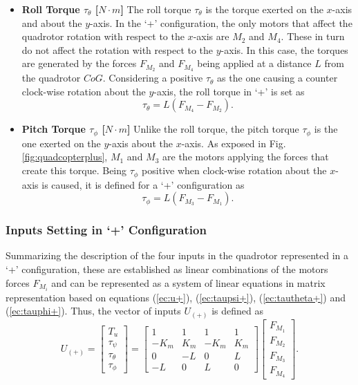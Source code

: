 \begin{itemize}
\item \textbf{Roll Torque $\tau_{\theta}$ [$N\cdot m$]}
The roll torque $\tau_\theta$ is the torque exerted on the $x$-axis and about the $y$-axis. In the `+' configuration, the only motors that affect the quadrotor rotation with respect to the $x$-axis are $M_2$ and $M_4$. These in turn do not affect the rotation with respect to the $y$-axis. In this case, the torques are generated by the forces $F_{M_2}$ and $F_{M_4}$ being applied at a distance $L$ from the quadrotor $CoG$. Considering a positive $\tau_\theta$ as the one causing a counter clock-wise rotation about the $y$-axis, the roll torque in `+' is set as
\begin{equation}
\label{ec:tautheta+}
\tau_{\theta} = L(F_{M_4}-F_{M_2}).
\end{equation}

\item \textbf{Pitch Torque $\tau_{\phi}$ [$N\cdot m$]}
Unlike the roll torque, the pitch torque $\tau_\phi$ is the one exerted on the $y$-axis about the $x$-axis. As exposed in Fig. \ref{fig:quadcopterplus}, $M_1$ and $M_3$ are the motors applying the forces that create this torque. Being $\tau_\phi$ positive when clock-wise rotation about the $x$-axis is caused, it is defined for a `+' configuration as
\begin{equation}
\label{ec:tauphi+}
\tau_{\phi} = L(F_{M_3}-F_{M_1}).
\end{equation}
\end{itemize}

\subsubsection{Inputs Setting in `+' Configuration}
Summarizing the description of the four inputs in the quadrotor represented in a `+' configuration, these are established as linear combinations of the motors forces $F_{M_i}$ and can be represented as a system of linear equations in matrix representation based on equations (\ref{ec:u+}), (\ref{ec:taupsi+}), (\ref{ec:tautheta+}) and (\ref{ec:tauphi+}). Thus, the vector of inputs $U_{(+)}$ is defined as
\begin{equation}
	U_{(+)} = \begin{bmatrix}
	T_u\\[5pt]
	\tau_{\psi}\\[5pt]
	\tau_{\theta}\\[5pt]
	\tau_{\phi}
	\end{bmatrix} = \begin{bmatrix}
	1 & 1 & 1 & 1 \\[5pt]
	-K_{m} & K_{m} & -K_{m} & K_{m}\\[5pt]
	0 & -L & 0 & L\\[5pt]
	-L & 0 & L & 0
							\end{bmatrix}
\begin{bmatrix}
F_{M_1}\\[5pt]
F_{M_2}\\[5pt]
F_{M_3}\\[5pt]
F_{M_4}
\end{bmatrix}.
	\label{ec:U_+}						
\end{equation}

